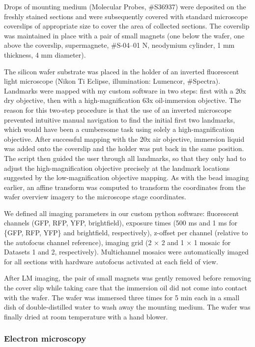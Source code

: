 \documentclass{article}
\begin{document}
Drops of mounting medium (Molecular Probes, \#S36937) were deposited on the freshly stained sections and were subsequently covered with standard microscope coverslips of appropriate size to cover the area of collected sections. The coverslip was maintained in place with a pair of small magnets (one below the wafer, one above the coverslip, supermagnete, \#S-04–01 N, neodymium cylinder, 1 mm thickness, 4 mm diameter).

The silicon wafer substrate was placed in the holder of an inverted fluorescent light microscope (Nikon Ti Eclipse, illumination: Lumencor, \#Spectra). Landmarks were mapped with my custom software in two steps: first with a 20x dry objective, then with a high-magnification 63x oil-immersion objective. The reason for this two-step procedure is that the use of an inverted microscope prevented intuitive manual navigation to find the initial first two landmarks, which would have been a cumbersome task using solely a high-magnification objective. After successful mapping with the 20x air objective, immersion liquid was added onto the coverslip and the holder was put back in the same position. The script then guided the user through all landmarks, so that they only had to adjust the high-magnification objective precisely at the landmark locations suggested by the low-magnification objective mapping. As with the bead imaging earlier, an affine transform was computed to transform the coordinates from the wafer overview imagery to the microscope stage coordinates.

We defined all imaging parameters in our custom python software: fluorescent channels (GFP, RFP, YFP, brightfield), exposure times (500 ms and 1 ms for \{GFP, RFP, YFP\} and brightfield, respectively), z-offset per channel (relative to the autofocus channel reference), imaging grid (2 × 2 and 1 × 1 mosaic for Datasets 1 and 2, respectively). Multichannel mosaics were automatically imaged for all sections with hardware autofocus activated at each field of view.

After LM imaging, the pair of small magnets was gently removed before removing the cover slip while taking care that the immersion oil did not come into contact with the wafer. The wafer was immersed three times for 5 min each in a small dish of double-distilled water to wash away the mounting medium. The wafer was finally dried at room temperature with a hand blower.

\subsubsection*{Electron microscopy}
\end{document}
